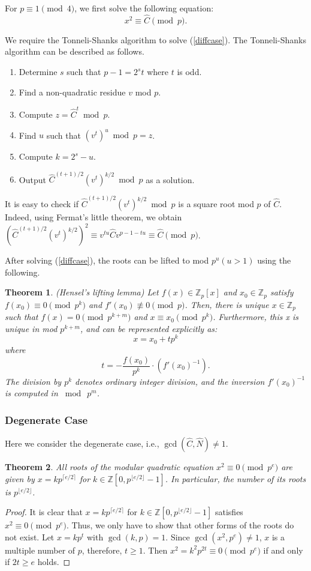 \documentclass{article}
\newtheorem{thm}{Theorem}
\begin{document}
For $p\equiv 1\pmod{4}$, we first solve the following equation:
\begin{equation}\label{diffcase}
x^2 \equiv \hat{C}\pmod{p}.
\end{equation}

We require the Tonneli-Shanks algorithm to solve (\ref{diffcase}). 
The Tonneli-Shanks algorithm can be described as follows.

{\small
\begin{enumerate}
\item Determine $s$ such that $p-1 = 2^st$ where $t$ is odd.
\item Find a non-quadratic residue $v$ mod $p$.
\item Compute $z = \hat{C}^t \bmod p$.
\item Find $u$ such that $(v^t)^u \bmod p = z$.
\item Compute $k = 2^s - u$.
\item Output $\hat{C}^{(t+1)/2}(v^t)^{k/2} \bmod p$ as a solution.
\end{enumerate}
}
It is easy to check if $\hat{C}^{(t+1)/2}(v^t)^{k/2} \bmod p$ is a square root mod $p$ of $\hat{C}$. 
Indeed, using Fermat's little theorem, we obtain 
$(\hat{C}^{(t+1)/2}(v^t)^{k/2})^2 \equiv v^{tu}\hat{C}v^{p-1-tu} \equiv \hat{C}\pmod{p}$.

After solving (\ref{diffcase}), the roots can be lifted to mod $p^u(u>1)$ using the following.

\begin{thm}(Hensel's lifting lemma) 
Let $f(x)\in\mathbb{Z}_p[x]$ and $x_0\in\mathbb{Z}_p$ satisfy 
$f(x_0)\equiv 0\pmod{p^k}$ and $f'(x_0)\not\equiv 0\pmod{p}$.
Then, there is unique $x\in\mathbb{Z}_p$ such that $f(x)=0\pmod{p^{k+m}}$ 
and $x\equiv x_0\pmod{p^k}$. 
Furthermore, this x is unique in mod $p^{k+m}$, and can be represented explicitly as:
$$
x = x_0 + tp^k
$$
where
$$
t = -\frac{f(x_0)}{p^k}\cdot (f'(x_0)^{-1}).
$$
The division by $p^k$ denotes ordinary integer division, 
and the inversion $f'(x_0)^{-1}$ is computed in $\bmod{~p^m}$.
\end{thm}

\subsubsection{Degenerate Case}
Here we consider the degenerate case, i.e., $\gcd(\hat{C},\hat{N})\ne 1$.

\begin{thm}\label{zerothm}
All roots of the modular quadratic equation $x^2\equiv 0\pmod{p^e}$ are given by
$x=kp^{\lceil e/2\rceil}$ for $k\in\mathbb{Z}[0,p^{\lfloor e/2\rfloor}-1]$. 
In particular, the number of its roots is $p^{\lfloor e/2\rfloor}$.
\end{thm}
\begin{proof} It is clear that $x=kp^{\lceil e/2\rceil}$ for $k\in\mathbb{Z}[0,p^{\lfloor e/2\rfloor}-1]$ satisfies 
$x^2\equiv 0\pmod{p^e}$. 
Thus, we only have to show that other forms of the roots do not exist. 
Let $x=kp^t$ with $\gcd(k,p)=1$. Since $\gcd(x^2,p^e)\ne 1$, $x$ is a multiple number of $p$, 
therefore, $t\geq 1$. 
Then $x^2 = k^2p^{2t} \equiv 0\pmod{p^e}$ if and only if $2t\geq e$ holds.
\end{proof}
\end{document}
